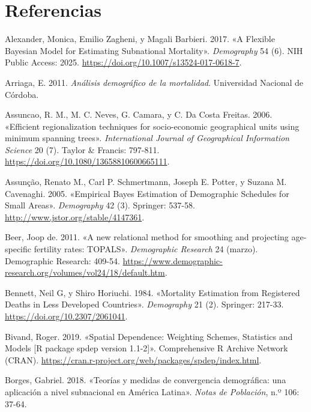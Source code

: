\documentclass[12pt,spanish,]{article}
\begin{document}
\hypertarget{referencias}{%
\section*{Referencias}\label{referencias}}

\hypertarget{refs}{}
\leavevmode\hypertarget{ref-Alexander2017}{}%
Alexander, Monica, Emilio Zagheni, y Magali Barbieri. 2017. «A Flexible
Bayesian Model for Estimating Subnational Mortality». \emph{Demography}
54 (6). NIH Public Access: 2025.
\url{https://doi.org/10.1007/s13524-017-0618-7}.

\leavevmode\hypertarget{ref-Arriaga2011}{}%
Arriaga, E. 2011. \emph{Análisis demográfico de la mortalidad}.
Universidad Nacional de Córdoba.

\leavevmode\hypertarget{ref-AssunCao2006}{}%
Assuncao, R. M., M. C. Neves, G. Camara, y C. Da Costa Freitas. 2006.
«Efficient regionalization techniques for socio-economic geographical
units using minimum spanning trees». \emph{International Journal of
Geographical Information Science} 20 (7). Taylor \& Francis: 797-811.
\url{https://doi.org/10.1080/13658810600665111}.

\leavevmode\hypertarget{ref-Assuncao2005}{}%
Assunção, Renato M., Carl P. Schmertmann, Joseph E. Potter, y Suzana M.
Cavenaghi. 2005. «Empirical Bayes Estimation of Demographic Schedules
for Small Areas». \emph{Demography} 42 (3). Springer: 537-58.
\url{http://www.jstor.org/stable/4147361}.

\leavevmode\hypertarget{ref-deBeer2011}{}%
Beer, Joop de. 2011. «A new relational method for smoothing and
projecting age-specific fertility rates: TOPALS». \emph{Demographic
Research} 24 (marzo). Demographic Research: 409-54.
\url{https://www.demographic-research.org/volumes/vol24/18/default.htm}.

\leavevmode\hypertarget{ref-Bennett_Horiuchi_1984}{}%
Bennett, Neil G, y Shiro Horiuchi. 1984. «Mortality Estimation from
Registered Deaths in Less Developed Countries». \emph{Demography} 21
(2). Springer: 217-33. \url{https://doi.org/10.2307/2061041}.

\leavevmode\hypertarget{ref-Bivand2019}{}%
Bivand, Roger. 2019. «Spatial Dependence: Weighting Schemes, Statistics
and Models {[}R package spdep version 1.1-2{]}». Comprehensive R Archive
Network (CRAN).
\url{https://cran.r-project.org/web/packages/spdep/index.html}.

\leavevmode\hypertarget{ref-Borges2018}{}%
Borges, Gabriel. 2018. «Teorías y medidas de convergencia demográfica:
una aplicación a nivel subnacional en América Latina». \emph{Notas de
Población}, n.º 106: 37-64.
\end{document}
